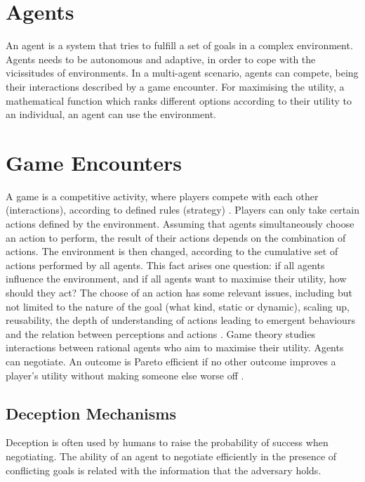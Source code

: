 \section{Agents}
An agent is a system that tries to fulfill a set of goals in a complex environment. Agents needs to be autonomous and adaptive, in order to cope with the vicissitudes of environments. In a multi-agent scenario, agents can compete, being their interactions described by a game encounter. For maximising the utility, a mathematical function which ranks different options according to their utility to an individual, an agent can use the environment.
\section{Game Encounters}
A game is a competitive activity, where players compete with each other (interactions), according to defined rules (strategy) \cite{aulas}
. Players can only take certain actions defined by the environment.  Assuming that agents simultaneously choose an action to perform, the result of their actions depends on the combination of actions. The environment is then changed, according to the cumulative set of actions performed by all agents. This fact arises one question: if all agents influence the environment, and if all agents want to maximise their utility, how should they act? The choose of an action has some relevant issues, including but not limited to the nature of the goal (what kind, static or dynamic), scaling up, reusability, the depth of understanding of actions leading to emergent behaviours and the relation between perceptions and actions \cite{Maes:1993:MAA:1668014.1668022}. Game theory studies interactions between rational agents who aim to maximise their utility. Agents can negotiate. An outcome is Pareto efficient if no other
outcome improves a player’s utility without making someone else worse off \cite{aulas}.

\subsection{Deception Mechanisms}
Deception is often used by humans to raise the probability of success when negotiating. The ability of an agent to negotiate efficiently in the presence of conflicting goals is related with the information that the adversary holds. 

